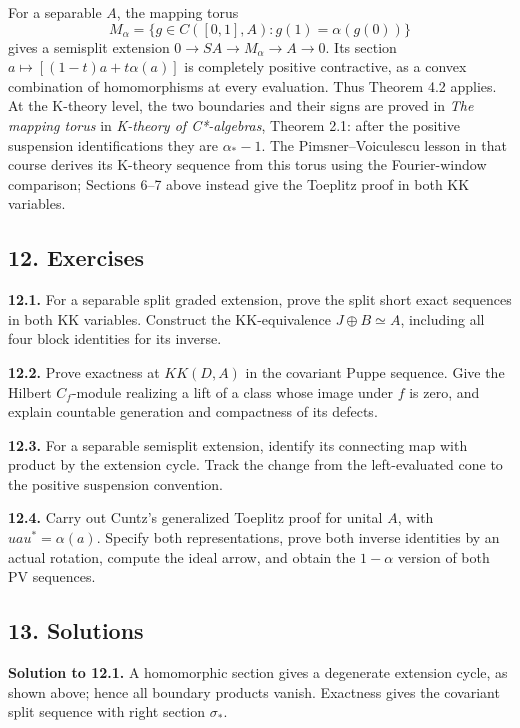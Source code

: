 \documentclass[
  11pt,
]{article}
\begin{document}
For a separable \(A\), the mapping torus \[
M_\alpha=\{g\in C([0,1],A):g(1)=\alpha(g(0))\}
\tag{11.4}
\] gives a semisplit extension \(0\to SA\to M_\alpha\to A\to0\). Its
section \(a\mapsto[(1-t)a+t\alpha(a)]\) is completely positive
contractive, as a convex combination of homomorphisms at every
evaluation. Thus Theorem 4.2 applies. At the K-theory level, the two
boundaries and their signs are proved in \emph{The mapping torus} in
\emph{K-theory of C*-algebras}, Theorem 2.1: after the positive
suspension identifications they are \(\alpha_*-1\). The
Pimsner--Voiculescu lesson in that course derives its K-theory sequence
from this torus using the Fourier-window comparison; Sections 6--7 above
instead give the Toeplitz proof in both KK variables.

\subsection{12. Exercises}\label{exercises}

\textbf{12.1.} For a separable split graded extension, prove the split
short exact sequences in both KK variables. Construct the KK-equivalence
\(J\oplus B\simeq A\), including all four block identities for its
inverse.

\textbf{12.2.} Prove exactness at \(KK(D,A)\) in the covariant Puppe
sequence. Give the Hilbert \(C_f\)-module realizing a lift of a class
whose image under \(f\) is zero, and explain countable generation and
compactness of its defects.

\textbf{12.3.} For a separable semisplit extension, identify its
connecting map with product by the extension cycle. Track the change
from the left-evaluated cone to the positive suspension convention.

\textbf{12.4.} Carry out Cuntz's generalized Toeplitz proof for unital
\(A\), with \(uau^*=\alpha(a)\). Specify both representations, prove
both inverse identities by an actual rotation, compute the ideal arrow,
and obtain the \(1-\alpha\) version of both PV sequences.

\subsection{13. Solutions}\label{solutions}

\textbf{Solution to 12.1.} A homomorphic section gives a degenerate
extension cycle, as shown above; hence all boundary products vanish.
Exactness gives the covariant split sequence with right section
\(\sigma_*\).
\end{document}

